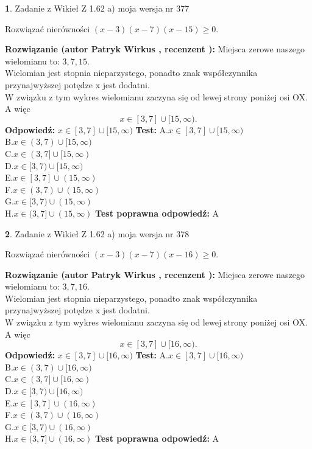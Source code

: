 \documentclass[12pt, a4paper]{article}
\theoremstyle{definition} %
\newtheorem{zad}{}
\newcommand{\zadStart}[1]{\begin{zad}#1\newline}
\newcommand{\zadStop}{\end{zad}}
\newcommand{\rozwStart}[2]{\noindent \textbf{Rozwiązanie (autor #1 , recenzent #2): }\newline}
\newcommand{\rozwStop}{\newline}
\newcommand{\odpStart}{\noindent \textbf{Odpowiedź:}\newline}
\newcommand{\odpStop}{\newline}
\newcommand{\testStart}{\noindent \textbf{Test:}\newline}
\newcommand{\testStop}{\newline}
\newcommand{\kluczStart}{\noindent \textbf{Test poprawna odpowiedź:}\newline}
\newcommand{\kluczStop}{\newline}
\begin{document}
\zadStart{Zadanie z Wikieł Z 1.62 a) moja wersja nr 377}

Rozwiązać nierówności $(x-3)(x-7)(x-15)\ge0$.
\zadStop
\rozwStart{Patryk Wirkus}{}
Miejsca zerowe naszego wielomianu to: $3, 7, 15$.\\
Wielomian jest stopnia nieparzystego, ponadto znak współczynnika przy\linebreak najwyższej potędze x jest dodatni.\\ W związku z tym wykres wielomianu zaczyna się od lewej strony poniżej osi OX. A więc $$x \in [3,7] \cup [15,\infty).$$
\rozwStop
\odpStart
$x \in [3,7] \cup [15,\infty)$
\odpStop
\testStart
A.$x \in [3,7] \cup [15,\infty)$\\
B.$x \in (3,7) \cup [15,\infty)$\\
C.$x \in (3,7] \cup [15,\infty)$\\
D.$x \in [3,7) \cup [15,\infty)$\\
E.$x \in [3,7] \cup (15,\infty)$\\
F.$x \in (3,7) \cup (15,\infty)$\\
G.$x \in [3,7) \cup (15,\infty)$\\
H.$x \in (3,7] \cup (15,\infty)$
\testStop
\kluczStart
A
\kluczStop



\zadStart{Zadanie z Wikieł Z 1.62 a) moja wersja nr 378}

Rozwiązać nierówności $(x-3)(x-7)(x-16)\ge0$.
\zadStop
\rozwStart{Patryk Wirkus}{}
Miejsca zerowe naszego wielomianu to: $3, 7, 16$.\\
Wielomian jest stopnia nieparzystego, ponadto znak współczynnika przy\linebreak najwyższej potędze x jest dodatni.\\ W związku z tym wykres wielomianu zaczyna się od lewej strony poniżej osi OX. A więc $$x \in [3,7] \cup [16,\infty).$$
\rozwStop
\odpStart
$x \in [3,7] \cup [16,\infty)$
\odpStop
\testStart
A.$x \in [3,7] \cup [16,\infty)$\\
B.$x \in (3,7) \cup [16,\infty)$\\
C.$x \in (3,7] \cup [16,\infty)$\\
D.$x \in [3,7) \cup [16,\infty)$\\
E.$x \in [3,7] \cup (16,\infty)$\\
F.$x \in (3,7) \cup (16,\infty)$\\
G.$x \in [3,7) \cup (16,\infty)$\\
H.$x \in (3,7] \cup (16,\infty)$
\testStop
\kluczStart
A
\kluczStop
\end{document}
